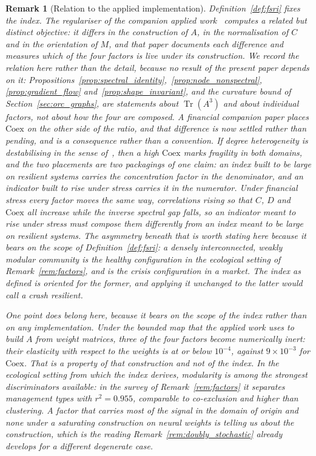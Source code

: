 \documentclass[11pt,a4paper]{article}
\newtheorem{remark}{Remark}
\begin{document}
\begin{remark}[Relation to the applied implementation]
\label{rem:composition}
Definition~\ref{def:fsri} fixes the index. The regulariser of the companion
applied work~\cite{acedo2026omegas} computes a related but distinct objective:
it differs in the construction of $A$, in the normalisation of $C$ and in the
orientation of $M$, and that paper documents each difference and measures which
of the four factors is live under its construction. We record the relation here
rather than the detail, because no result of the present paper depends on it:
Propositions~\ref{prop:spectral_identity},~\ref{prop:node_nonspectral},
\ref{prop:gradient_flow} and~\ref{prop:shape_invariant}, and the curvature
bound of Section~\ref{sec:orc_graphs}, are statements about
$\operatorname{Tr}(A^3)$ and about individual factors, not about how the four
are composed. A financial companion paper places $\mathrm{Coex}$ on the other
side of the ratio, and that difference is now settled rather than pending, and
is a consequence rather than a convention. If degree heterogeneity is
destabilising in the sense of~\cite{yan2017}, then a high $\mathrm{Coex}$ marks
fragility in both domains, and the two placements are two packagings of one
claim: an index built to be large on resilient systems carries the
concentration factor in the denominator, and an indicator built to rise under
stress carries it in the numerator. Under financial stress every factor moves the same
way, correlations rising so that $C$, $D$ and $\mathrm{Coex}$ all increase while
the inverse spectral gap falls, so an indicator meant to rise under stress must
compose them differently from an index meant to be large on resilient systems.
The asymmetry beneath that is worth stating here because it bears on the scope
of Definition~\ref{def:fsri}: a densely interconnected, weakly modular community
is the healthy configuration in the ecological setting of
Remark~\ref{rem:factors}, and is the crisis configuration in a market. The index
as defined is oriented for the former, and applying it unchanged to the latter
would call a crash resilient.

One point does belong here, because it bears on the scope of the index rather
than on any implementation. Under the bounded map that the applied work uses to
build $A$ from weight matrices, three of the four factors become numerically
inert: their elasticity with respect to the weights is at or below $10^{-4}$,
against $9\times10^{-3}$ for $\mathrm{Coex}$. That is a property of \emph{that
construction} and not of the index. In the ecological setting from which the
index derives, modularity is among the strongest discriminators available: in
the survey of Remark~\ref{rem:factors} it separates management types with
$r^2 = 0.955$, comparable to co-exclusion and higher than clustering. A factor
that carries most of the signal in the domain of origin and none under a
saturating construction on neural weights is telling us about the construction,
which is the reading Remark~\ref{rem:doubly_stochastic} already develops for a
different degenerate case.
\end{remark}
\end{document}
